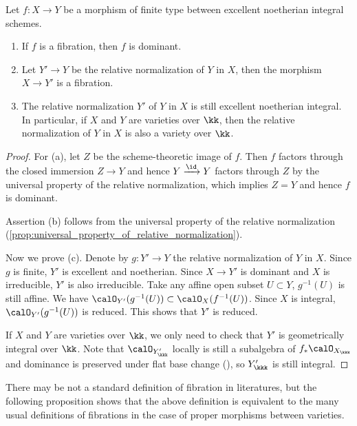 \begin{proposition}\label{prop:basic_properties_of_fibrations}
	Let $f: X \to Y$ be a morphism of finite type between excellent noetherian integral schemes.
	\begin{enumerate}
		\item If $f$ is a fibration, then $f$ is dominant.
		\item Let $Y' \to Y$ be the relative normalization of $Y$ in $X$, then the morphism $X \to Y'$ is a fibration.
		\item The relative normalization $Y'$ of $Y$ in $X$ is still excellent noetherian integral.
		      In particular, if $X$ and $Y$ are varieties over $\kk$, then the relative normalization of $Y$ in $X$ is also a variety over $\kk$.
	\end{enumerate}
\end{proposition}
\begin{proof}
	For (a), let $Z$ be the scheme-theoretic image of $f$.
	Then $f$ factors through the closed immersion $Z \to Y$ and hence $Y \xrightarrow{\id} Y$ factors through $Z$ by the universal property of the relative normalization, which implies $Z = Y$ and hence $f$ is dominant.

	Assertion (b) follows from the universal property of the relative normalization (\cref{prop:universal_property_of_relative_normalization}).

	Now we prove (c).
	Denote by $g:Y' \to Y$ the relative normalization of $Y$ in $X$.
	Since $g$ is finite, $Y'$ is excellent and noetherian.
	Since $X \to Y'$ is dominant and $X$ is irreducible, $Y'$ is also irreducible.
	Take any affine open subset $U \subset Y$, $g^{-1}(U)$ is still affine.
	We have $\calO_{Y'}(g^{-1}(U)) \subset \calO_X(f^{-1}(U))$.
	Since $X$ is integral, $\calO_{Y'}(g^{-1}(U))$ is reduced.
	This shows that $Y'$ is reduced.

	If $X$ and $Y$ are varieties over $\kk$, we only need to check that $Y'$ is geometrically integral over $\kk$.
	Note that $\calO_{Y'_\kkk}$ locally is still a subalgebra of $f_* \calO_{X_\kkk}$ and dominance is preserved under flat base change (\cite[\href{https://stacks.math.columbia.edu/tag/0H3F}{Tag 0H3F}]{Stacks}), so $Y'_\kkk$ is still integral.
\end{proof}

There may be not a standard definition of fibration in literatures, but the following proposition shows that the above definition is equivalent to the many usual definitions of fibrations in the case of proper morphisms between varieties.

